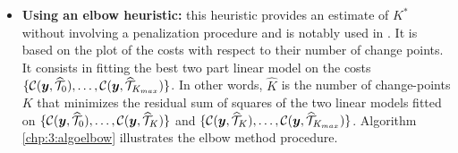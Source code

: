 \begin{itemize}
\item \textbf{Using an elbow heuristic:} this heuristic provides an estimate of $K^*$ without involving a penalization procedure and is notably used in \cite{lung2015}. It is based on the plot of the costs with respect to their number of change points. It consists in fitting the best two part linear model on the costs $\{{\mathcal C}(\bm y, \widehat{{\mathcal T}}_0),\dots,{\mathcal C}(\bm y, \widehat{{\mathcal T}}_{K_{max}})\}$. In other words, $\widehat{K}$ is the number of change-points $K$ that minimizes the residual sum of squares of the two linear models fitted on $\{{\mathcal C}(\bm y, \widehat{{\mathcal T}}_0),\dots,{\mathcal C}(\bm y, \widehat{{\mathcal T}}_{K})\}$ and $\{{\mathcal C}(\bm y, \widehat{{\mathcal T}}_K),\dots,{\mathcal C}(\bm y, \widehat{{\mathcal T}}_{K_{max}})\}$. Algorithm \ref{chp:3:algoelbow} illustrates the elbow method procedure.


\end{itemize}
